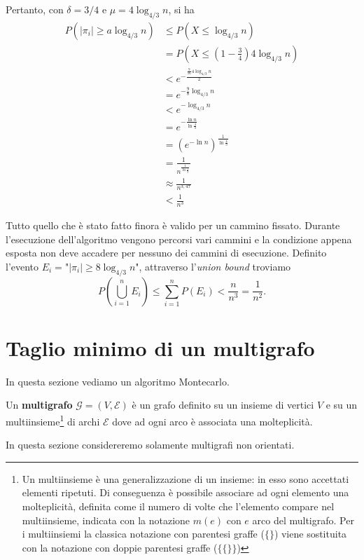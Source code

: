 Pertanto, con $\delta=3/4$ e $\mu = 4\log_{4/3}n$, si ha
\begin{align*}
P(|\pi_i|\geq a\log_{4/3}n)&\leq P(X\leq \log_{4/3}n) \\
&=P\left(X\leq \left(1-\frac{3}{4}\right)4\log_{4/3}n\right) \\
&<e^{-\frac{\frac{9}{16}4\log_{4/3}n}{2}} \\
&=e^{-\frac{9}{8}\log_{4/3}n} \\
&<e^{-\log_{4/3}n} \\
&=e^{-\frac{\ln n}{\ln\frac{4}{3}}} \\
&=(e^{-\ln n})^{\frac{1}{\ln\frac{4}{3}}} \\
&=\frac{1}{n^{\frac{1}{\ln\frac{4}{3}}}} \\
&\approx\frac{1}{n^{3,47}} \\
&<\frac{1}{n^3}
\end{align*}

Tutto quello che è stato fatto finora è valido per un cammino fissato. Durante l'esecuzione dell'algoritmo vengono percorsi vari cammini e la condizione appena esposta non deve accadere per nessuno dei cammini di esecuzione. Definito l'evento $E_i=$"$|\pi_i|\geq 8\log_{4/3}n$", attraverso l'\textit{union bound} troviamo
\[
P\left(\bigcup_{i=1}^{n}E_i\right)\leq \sum_{i=1}^{n}P(E_i)<\frac{n}{n^3}=\frac{1}{n^2}.
\]

\section{Taglio minimo di un multigrafo}
In questa sezione vediamo un algoritmo Montecarlo.

\begin{definizione}
Un \textbf{multigrafo} $\mathcal{G}=(V,\mathcal{E})$ è un grafo definito su un insieme di vertici $V$ e su un multiinsieme\footnote{Un multiinsieme è una generalizzazione di un insieme: in esso sono accettati elementi ripetuti. Di conseguenza è possibile associare ad ogni elemento una molteplicità, definita come il numero di volte che l'elemento compare nel multiinsieme, indicata con la notazione $m(e)$ con $e$ arco del multigrafo. Per i multiinsiemi la classica notazione con parentesi graffe ($\{\}$) viene sostituita con la notazione con doppie parentesi graffe ($\{\{\}\}$)} di archi $\mathcal{E}$ dove ad ogni arco è associata una molteplicità.
\end{definizione}

In questa sezione considereremo solamente multigrafi non orientati.

